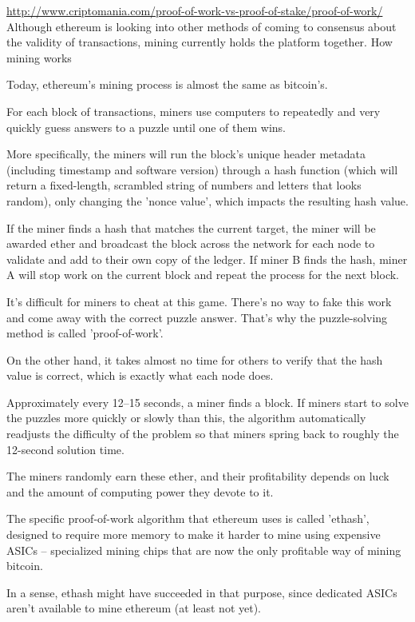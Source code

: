 \documentclass[11pt,a4paper]{article}
\begin{document}
\url{http://www.criptomania.com/proof-of-work-vs-proof-of-stake/proof-of-work/}\\


Although ethereum is looking into other methods of coming to consensus about the validity of transactions, mining currently holds the platform together.
How mining works

Today, ethereum's mining process is almost the same as bitcoin’s.

For each block of transactions, miners use computers to repeatedly and very quickly guess answers to a puzzle until one of them wins.

More specifically, the miners will run the block’s unique header metadata (including timestamp and software version) through a hash function (which will return a fixed-length, scrambled string of numbers and letters that looks random), only changing the 'nonce value', which impacts the resulting hash value.

If the miner finds a hash that matches the current target, the miner will be awarded ether and broadcast the block across the network for each node to validate and add to their own copy of the ledger. If miner B finds the hash, miner A will stop work on the current block and repeat the process for the next block.

It's difficult for miners to cheat at this game. There's no way to fake this work and come away with the correct puzzle answer. That's why the puzzle-solving method is called 'proof-of-work'.

On the other hand, it takes almost no time for others to verify that the hash value is correct, which is exactly what each node does.

Approximately every 12–15 seconds, a miner finds a block. If miners start to solve the puzzles more quickly or slowly than this, the algorithm automatically readjusts the difficulty of the problem so that miners spring back to roughly the 12-second solution time.

The miners randomly earn these ether, and their profitability depends on luck and the amount of computing power they devote to it.

The specific proof-of-work algorithm that ethereum uses is called 'ethash', designed to require more memory to make it harder to mine using expensive ASICs – specialized mining chips that are now the only profitable way of mining bitcoin.

In a sense, ethash might have succeeded in that purpose, since dedicated ASICs aren't available to mine ethereum (at least not yet).
\end{document}
